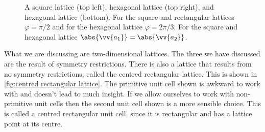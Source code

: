 \documentclass[fleqn]{NotesClass}
\begin{document}
\begin{figure}
        \caption{A square lattice (top left), hexagonal lattice (top right), and hexagonal lattice (bottom). For the square and rectangular lattices \(\varphi = \pi/2\) and for the hexagonal lattice \(\varphi = 2\pi/3\). For the square and hexagonal lattice \(\abs{\vv{a_1}} = \abs{\vv{a_2}}\).}
        \label{fig:square rectangle hexagon lattice}
    \end{figure}
    
    What we are discussing are two-dimensional lattices.
    The three we have discussed are the result of symmetry restrictions.
    There is also a lattice that results from no symmetry restrictions, called the centred rectangular lattice.
    This is shown in \cref{fig:centred rectangular lattice}.
    The primitive unit cell shown is awkward to work with and doesn't lead to much insight.
    If we allow ourselves to work with non-primitive unit cells then the second unit cell shown is a more sensible choice.
    This is called a centred rectangular unit cell, since it is rectangular and has a lattice point at its centre.
    
\end{document}
